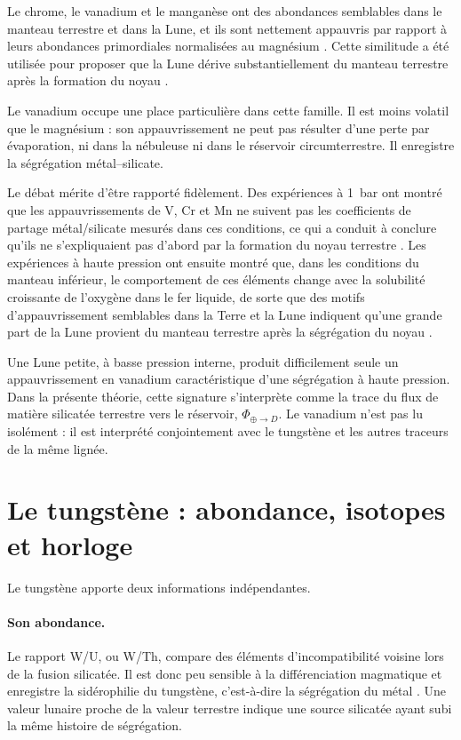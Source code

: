 \documentclass[11pt,a4paper,openany]{report}
\begin{document}
Le chrome, le vanadium et le manganèse ont des abondances semblables dans le manteau terrestre
et dans la Lune, et ils sont nettement appauvris par rapport à leurs abondances primordiales
normalisées au magnésium \cite{Ringwood1990}. Cette similitude a été utilisée pour proposer que la
Lune dérive substantiellement du manteau terrestre après la formation du noyau
\cite{Drake1989}.

Le vanadium occupe une place particulière dans cette famille. Il est moins volatil que le magnésium :
son appauvrissement ne peut pas résulter d'une perte par évaporation, ni dans la nébuleuse ni
dans le réservoir circumterrestre. Il enregistre la ségrégation métal--silicate.

Le débat mérite d'être rapporté fidèlement. Des expériences à 1~bar ont montré que les
appauvrissements de V, Cr et Mn ne suivent pas les coefficients de partage métal/silicate mesurés
dans ces conditions, ce qui a conduit à conclure qu'ils ne s'expliquaient pas d'abord par la
formation du noyau terrestre \cite{Drake1989}. Les expériences à haute pression ont ensuite
montré que, dans les conditions du manteau inférieur, le comportement de ces éléments change
avec la solubilité croissante de l'oxygène dans le fer liquide, de sorte que des motifs
d'appauvrissement semblables dans la Terre et la Lune indiquent qu'une grande part de la Lune
provient du manteau terrestre après la ségrégation du noyau \cite{Ringwood1990,GessmannRubie2000}.

\begin{lecture}
Une Lune petite, à basse pression interne, produit difficilement seule un appauvrissement en
vanadium caractéristique d'une ségrégation à haute pression. Dans la présente théorie, cette
signature s'interprète comme la trace du flux de matière silicatée terrestre vers le réservoir,
$\Phi_{\oplus\to D}$. Le vanadium n'est pas lu isolément : il est interprété conjointement avec le
tungstène et les autres traceurs de la même lignée.
\end{lecture}

\section{Le tungstène : abondance, isotopes et horloge}

Le tungstène apporte deux informations indépendantes.

\paragraph{Son abondance.}
Le rapport W/U, ou W/Th, compare des éléments d'incompatibilité voisine lors de la fusion
silicatée. Il est donc peu sensible à la différenciation magmatique et enregistre la sidérophilie du
tungstène, c'est-à-dire la ségrégation du métal \cite{Newsom1986}. Une valeur lunaire proche de la
valeur terrestre indique une source silicatée ayant subi la même histoire de ségrégation.
\end{document}
